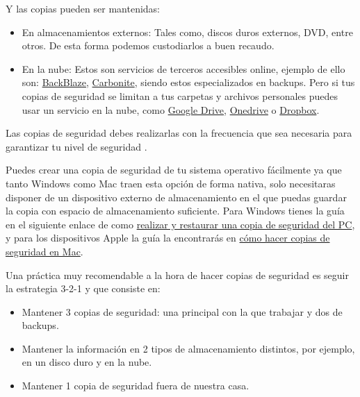 \documentclass[
  spanish,
  a4paper,
  openany]{book}
\begin{document}
Y las copias pueden ser mantenidas:

\begin{itemize}
\item
  En almacenamientos externos: Tales como, discos duros externos, DVD, entre otros. De esta forma podemos custodiarlos a buen recaudo.
\item
  En la nube: Estos son servicios de terceros accesibles online, ejemplo de ello son: \href{https://www.backblaze.com/home-1.html}{BackBlaze}, \href{https://www.carbonite.com/}{Carbonite}, siendo estos especializados en backups. Pero si tus copias de seguridad se limitan a tus carpetas y archivos personales puedes usar un servicio en la nube, como \href{https://www.google.com/intl/en_in/drive/}{Google Drive}, \href{https://www.microsoft.com/en-us/microsoft-365/onedrive/online-cloud-storage}{Onedrive} o \href{https://www.dropbox.com/}{Dropbox}.
\end{itemize}

Las copias de seguridad debes realizarlas con la frecuencia que sea necesaria para garantizar tu nivel de seguridad \citep{tipos-copia-seguridad}.

Puedes crear una copia de seguridad de tu sistema operativo fácilmente ya que tanto Windows como Mac traen esta opción de forma nativa, solo necesitaras disponer de un dispositivo externo de almacenamiento en el que puedas guardar la copia con espacio de almacenamiento suficiente. Para Windows tienes la guía en el siguiente enlace de como \href{https://support.microsoft.com/es-es/windows/realizar-y-restaurar-una-copia-de-seguridad-del-pc-ac359b36-7015-4694-de9a-c5eac1ce9d9c}{realizar y restaurar una copia de seguridad del PC}, y para los dispositivos Apple la guía la encontrarás en \href{https://support.apple.com/es-es/mac-backup}{cómo hacer copias de seguridad en Mac}.

Una práctica muy recomendable a la hora de hacer copias de seguridad es seguir la estrategia 3-2-1 \citep{INCI-copia-3-2-1} y que consiste en:

\begin{itemize}
\item
  Mantener 3 copias de seguridad: una principal con la que trabajar y dos de backups.
\item
  Mantener la información en 2 tipos de almacenamiento distintos, por ejemplo, en un disco duro y en la nube.
\item
  Mantener 1 copia de seguridad fuera de nuestra casa.
\end{itemize}
\end{document}
